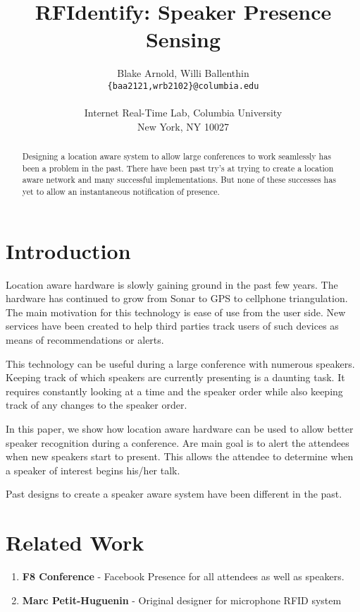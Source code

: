 \documentclass{article}
\title{RFIdentify: Speaker Presence Sensing}
\author{Blake Arnold, Willi Ballenthin\\
	{\tt\{baa2121,wrb2102\}@columbia.edu}\\
	\\
	Internet Real-Time Lab, Columbia University\\
	New York, NY 10027\\
	}
\begin{document}
\makecover
\maketitle

\begin{abstract}
	
	Designing a location aware system to allow large conferences to work seamlessly has been a problem in the past. There have been
	 past try's at trying to create a location aware network and many successful implementations. But none of these successes has yet to allow an instantaneous notification of presence.

\end{abstract}


\section{Introduction} 
	
	Location aware hardware is slowly gaining ground in the past few years. The hardware 
	has continued to grow from Sonar to GPS to cellphone triangulation. 
	The main motivation for this technology is ease of use from the user side. New services
	 have been created to help third parties track users of such devices as means of recommendations or alerts.

	This technology can be useful during a large conference with numerous speakers.
	 Keeping track of which speakers are currently presenting is a daunting task. It requires
	  constantly looking at a time and the speaker order while also keeping track of any changes
	   to the speaker order.

	In this paper, we show how location aware hardware can be used to allow 
	better speaker recognition during a conference. Are main goal is to alert the 
	attendees when new speakers start to present. This allows the attendee to determine 
	when a speaker of interest begins his/her talk.

	Past designs to create a speaker aware system have been different in the past.


\section{Related Work}
	
	\begin{enumerate}
	\item {\bf F8 Conference} - 
	Facebook Presence for all attendees as well as speakers.

	\item {\bf Marc Petit-Huguenin} - 
	Original designer for microphone RFID system
	\end{enumerate}
\end{document}
